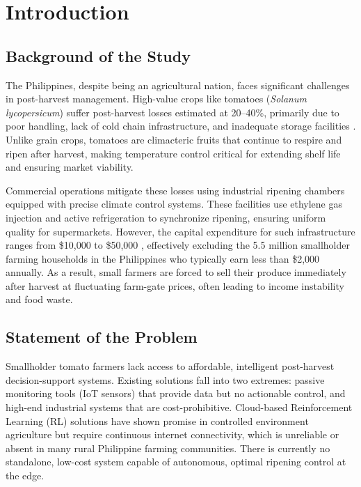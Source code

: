 \documentclass[conference]{IEEEtran}
\begin{document}
\section{Introduction}
\label{sec:introduction}

\subsection{Background of the Study}
The Philippines, despite being an agricultural nation, faces significant challenges in post-harvest management. High-value crops like tomatoes (\textit{Solanum lycopersicum}) suffer post-harvest losses estimated at 20--40\%, primarily due to poor handling, lack of cold chain infrastructure, and inadequate storage facilities \cite{fao2019}. Unlike grain crops, tomatoes are climacteric fruits that continue to respire and ripen after harvest, making temperature control critical for extending shelf life and ensuring market viability.

Commercial operations mitigate these losses using industrial ripening chambers equipped with precise climate control systems. These facilities use ethylene gas injection and active refrigeration to synchronize ripening, ensuring uniform quality for supermarkets. However, the capital expenditure for such infrastructure ranges from \$10,000 to \$50,000 \cite{prasad2018}, effectively excluding the 5.5 million smallholder farming households in the Philippines who typically earn less than \$2,000 annually. As a result, small farmers are forced to sell their produce immediately after harvest at fluctuating farm-gate prices, often leading to income instability and food waste.

\subsection{Statement of the Problem}
Smallholder tomato farmers lack access to affordable, intelligent post-harvest decision-support systems. Existing solutions fall into two extremes: passive monitoring tools (IoT sensors) that provide data but no actionable control, and high-end industrial systems that are cost-prohibitive. Cloud-based Reinforcement Learning (RL) solutions have shown promise in controlled environment agriculture but require continuous internet connectivity, which is unreliable or absent in many rural Philippine farming communities. There is currently no standalone, low-cost system capable of autonomous, optimal ripening control at the edge.
\end{document}
